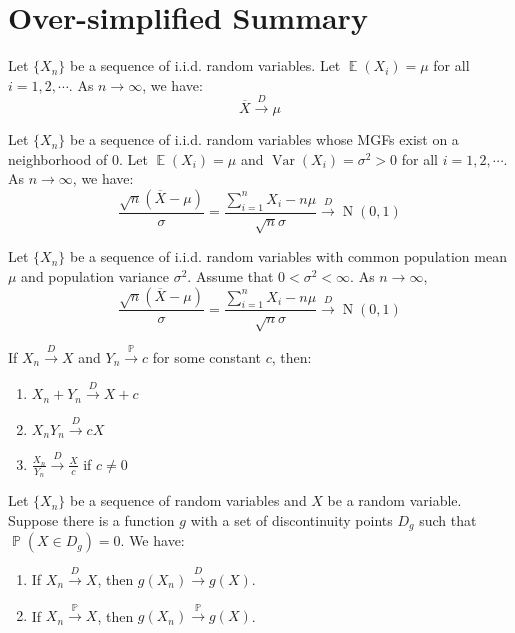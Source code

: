 \documentclass{huhtakm-template-book-v2}
\DeclareMathOperator{\prob}{\mathbb{P}}
\DeclareMathOperator{\E}{\mathbb{E}}
\DeclareMathOperator{\Var}{Var}
\DeclareMathOperator{\N}{N}
\begin{document}
\appendix
\renewcommand{\thechapter}{\Alph{chapter}}
\chapter{Over-simplified Summary}
    \begin{thm}
        Let $\{X_{n}\}$ be a sequence of i.i.d. random variables. Let $\E(X_{i})=\mu$ for all $i=1,2,\cdots$. As $n\to\infty$, we have:
        \begin{equation*}
            \overline{X}\xrightarrow{D}\mu
        \end{equation*}
    \end{thm}
    \begin{thm}
        Let $\{X_{n}\}$ be a sequence of i.i.d. random variables whose MGFs exist on a neighborhood of $0$. Let $\E(X_{i})=\mu$ and $\Var(X_{i})=\sigma^{2}>0$ for all $i=1,2,\cdots$. As $n\to\infty$, we have:
        \begin{equation*}
            \frac{\sqrt{n}(\overline{X}-\mu)}{\sigma}=\frac{\sum_{i=1}^{n}X_{i}-n\mu}{\sqrt{n}\sigma}\xrightarrow{D}\N(0,1)
        \end{equation*}
    \end{thm}
    \begin{thm} 
        Let $\{X_{n}\}$ be a sequence of i.i.d. random variables with common population mean $\mu$ and population variance $\sigma^{2}$. Assume that $0<\sigma^{2}<\infty$. As $n\to\infty$,
        \begin{equation*}
            \frac{\sqrt{n}(\overline{X}-\mu)}{\sigma}=\frac{\sum_{i=1}^{n}X_{i}-n\mu}{\sqrt{n}\sigma}\xrightarrow{D}\N(0,1)
        \end{equation*}
    \end{thm}
    \begin{thm}
        If $X_{n}\xrightarrow{D}X$ and $Y_{n}\xrightarrow{\prob}c$ for some constant $c$, then:
        \begin{enumerate}
            \item $X_{n}+Y_{n}\xrightarrow{D}X+c$
            \item $X_{n}Y_{n}\xrightarrow{D}cX$
            \item $\frac{X_{n}}{Y_{n}}\xrightarrow{D}\frac{X}{c}$ if $c\neq 0$
        \end{enumerate}
    \end{thm}
    \begin{thm}
        Let $\{X_{n}\}$ be a sequence of random variables and $X$ be a random variable. Suppose there is a function $g$ with a set of discontinuity points $D_{g}$ such that $\prob(X\in D_{g})=0$. We have:
        \begin{enumerate}
            \item If $X_{n}\xrightarrow{D}X$, then $g(X_{n})\xrightarrow{D}g(X)$.
            \item If $X_{n}\xrightarrow{\prob}X$, then $g(X_{n})\xrightarrow{\prob}g(X)$.
        \end{enumerate}
    \end{thm}
\end{document}
